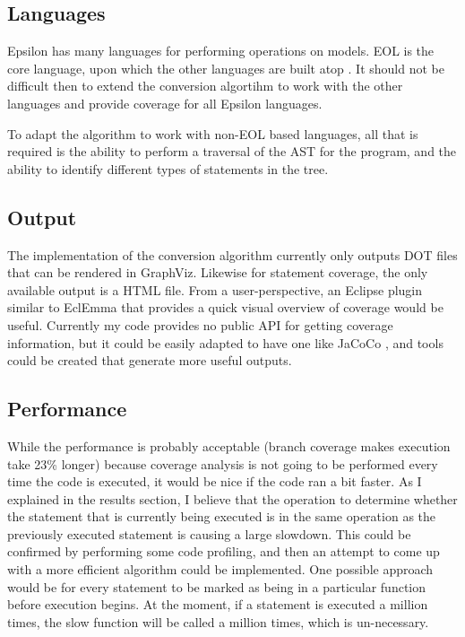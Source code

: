 \subsection{Languages}

Epsilon has many languages for performing operations on models. EOL is the core language, upon which the other languages are built atop \citep{epsilonBook}. It should not be difficult then to extend the conversion algortihm to work with the other languages and provide coverage for all Epsilon languages.

To adapt the algorithm to work with non-EOL based languages, all that is required is the ability to perform a traversal of the AST for the program, and the ability to identify different types of statements in the tree.

\subsection{Output}
The implementation of the conversion algorithm currently only outputs DOT files that can be rendered in GraphViz. Likewise for statement coverage, the only available output is a HTML file. From a user-perspective, an Eclipse plugin similar to EclEmma that provides a quick visual overview of coverage would be useful. Currently my code provides no public API for getting coverage information, but it could be easily adapted to have one like JaCoCo \citep{JaCoCo}, and tools could be created that generate more useful outputs.


\subsection{Performance}

While the performance is probably acceptable (branch coverage makes execution take 23\% longer) because coverage analysis is not going to be performed every time the code is executed, it would be nice if the code ran a bit faster. As I explained in the results section, I believe that the operation to determine whether the statement that is currently being executed is in the same operation as the previously executed statement is causing a large slowdown. This could be confirmed by performing some code profiling, and then an attempt to come up with a more efficient algorithm could be implemented. One possible approach would be for every statement to be marked as being in a particular function before execution begins. At the moment, if a statement is executed a million times, the slow function will be called a million times, which is un-necessary.

